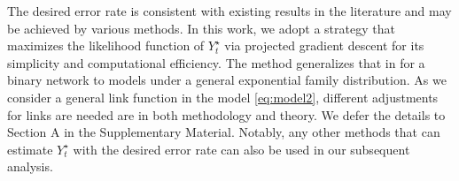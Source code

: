 \documentclass[12pt]{article}
\begin{document}
The desired error rate is consistent with existing results in the literature and may be achieved by  various methods.  
In this work, we adopt a strategy that maximizes the likelihood function of $Y_t^{\star}$ via projected gradient descent for its simplicity and computational efficiency. 
The method generalizes that in  \cite{ma2020universal} for a binary network to models under a general exponential family distribution.  
As we consider a general link function in the model \eqref{eq:model2},
different adjustments for links  are needed are in both methodology and theory. We defer the details to Section A in  the Supplementary Material. 
Notably, 
any other methods that can estimate $Y_t^{\star}$ with the desired error rate can also be used in our subsequent analysis.  

\end{document}
